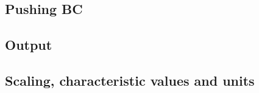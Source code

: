 \documentclass[a4paper,11pt]{article}
\begin{document}
\subsection{Pushing BC}
\label{sec:pushing}


\subsection{Output}
\label{sec:output}

\newpage
\subsection{Scaling, characteristic values and units}
\label{sec:scaling}
\end{document}
